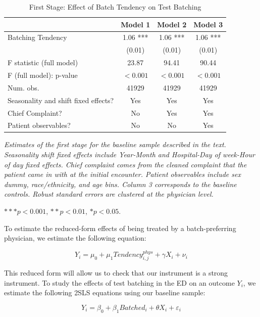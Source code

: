 \documentclass[,,nonblindrev]{informs}
\begin{document}
\begin{table}[ht]
\centering
\caption{First Stage: Effect of Batch Tendency on Test Batching}
\label{tab:regression}
\begin{tabular}{p{9cm}ccc}
\toprule
\textbf{} & Model 1 & Model 2 & Model 3 \\
\midrule
Batching Tendency & 1.06 *** & 1.06 *** & 1.06 *** \\
 & (0.01) & (0.01) & (0.01) \\
\midrule
F statistic (full model) & 23.87 & 94.41 & 90.44  \\  
F (full model): p-value & $<0.001$ & $<0.001$ & $<0.001$ \\
\midrule
Num. obs. & 41929 & 41929 & 41929 \\
Seasonality and shift fixed effects? & Yes & Yes & Yes \\
Chief Complaint? & No & Yes & Yes \\
Patient observables? & No & No & Yes \\
\bottomrule
\end{tabular}
\begin{tablenotes}
\small
\item \textit{Estimates of the first stage for the baseline sample described in the text. Seasonality shift fixed effects include Year-Month and Hospital-Day of week-Hour of day fixed effects. Chief complaint comes from the cleaned complaint that the patient came in with at the initial encounter. Patient observables include sex dummy, race/ethnicity, and age bins. Column 3 corresponds to the baseline controls. Robust standard errors are clustered at the physician level.}
\item $*** p < 0.001$, $** p < 0.01$, $* p < 0.05$.
\end{tablenotes}
\end{table}

To estimate the reduced-form effects of being treated by a
batch-preferring physician, we estimate the following equation:

\begin{equation}
Y_i = \mu_0 + \mu_1 Tendency_{i,j}^{phys} + \gamma X_i + \nu_i
\end{equation}

This reduced form will allow us to check that our instrument is a strong
instrument. To study the effects of test batching in the ED on an
outcome \(Y_i\), we estimate the following 2SLS equations using our
baseline sample:

\begin{equation}
Y_i = \beta_0 + \beta_1 Batched_i + \theta X_i + \varepsilon_i
\end{equation}
\end{document}
